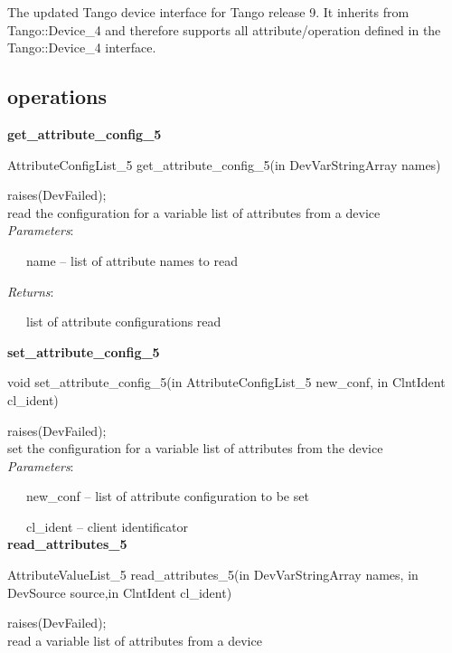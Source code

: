 The updated Tango device interface for Tango release 9. It inherits
from Tango::Device\_4 and therefore supports all attribute/operation
defined in the Tango::Device\_4 interface.

\subsection{operations}

\textbf{get\_attribute\_config\_5}

AttributeConfigList\_5 get\_attribute\_config\_5(in DevVarStringArray
names)

raises(DevFailed);\\

read the configuration for a variable list of attributes from a device\\

\emph{Parameters}:

~~~name – list of attribute names to read

\emph{Returns}:

~~~list of attribute configurations read\\

\begin{flushleft}
\textbf{set\_attribute\_config\_5}
\par\end{flushleft}

void set\_attribute\_config\_5(in AttributeConfigList\_5 new\_conf,
in ClntIdent cl\_ident)

raises(DevFailed);\\

set the configuration for a variable list of attributes from the device\\

\emph{Parameters}:

~~~new\_conf – list of attribute configuration to be set

~~~cl\_ident – client identificator\\

\textbf{read\_attributes\_5}

AttributeValueList\_5 read\_attributes\_5(in DevVarStringArray names,
in DevSource source,in ClntIdent cl\_ident)

raises(DevFailed);\\

read a variable list of attributes from a device\\

